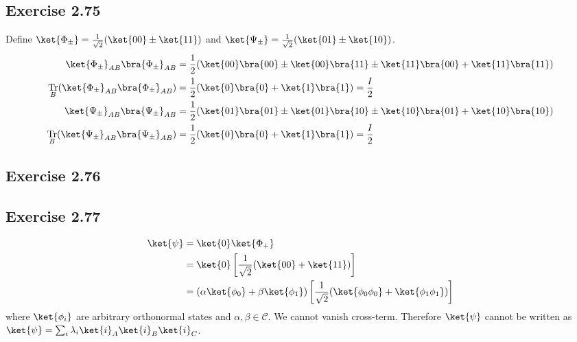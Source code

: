 \documentclass[a4paper,12pt]{article}
\DeclareMathOperator{\Tr}{Tr}
\begin{document}
\subsection*{Exercise 2.75}
Define $\ket{\Phi_\pm} = \frac{1}{\sqrt{2}} (\ket{00} \pm \ket{11})$ and $\ket{\Psi_\pm} = \frac{1}{\sqrt{2}} (\ket{01} \pm \ket{10})$.
\begin{align*}
	\ket{\Phi_\pm}_{AB}\bra{\Phi_\pm}_{AB} &= \frac{1}{2} (\ket{00}\bra{00} \pm \ket{00}\bra{11} \pm \ket{11}\bra{00} + \ket{11}\bra{11})\\
	\Tr_B (\ket{\Phi_\pm}_{AB}\bra{\Phi_\pm}_{AB}) &= \frac{1}{2} (\ket{0}\bra{0} + \ket{1}\bra{1}) = \frac{I}{2}\\
%
	\ket{\Psi_\pm}_{AB}\bra{\Psi_\pm}_{AB} &= \frac{1}{2} (\ket{01}\bra{01} \pm \ket{01}\bra{10} \pm \ket{10}\bra{01} + \ket{10}\bra{10})\\
	\Tr_B (\ket{\Psi_\pm}_{AB}\bra{\Psi_\pm}_{AB}) &= \frac{1}{2} (\ket{0}\bra{0} + \ket{1}\bra{1}) = \frac{I}{2}
\end{align*}


\subsection*{Exercise 2.76}



\subsection*{Exercise 2.77}
\begin{align*}
	\ket{\psi}  &=  \ket{0}  \ket{\Phi_+}\\
		&= \ket{0} \left[\frac{1}{\sqrt{2}}(\ket{00} + \ket{11})\right]\\
		&= (\alpha \ket{\phi_0} + \beta \ket{\phi_1})  \left[\frac{1}{\sqrt{2}}(\ket{\phi_0 \phi_0} + \ket{\phi_1 \phi_1})\right]\\
\end{align*}
where $\ket{\phi_i}$ are arbitrary orthonormal states and $\alpha, \beta \in \mathcal{C}$.
We cannot vanish cross-term. Therefore $\ket{\psi}$ cannot be written as $\ket{\psi} = \sum_i \lambda_i \ket{i}_A \ket{i}_B \ket{i}_C$.
\end{document}
